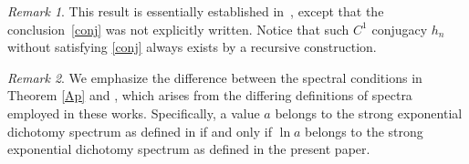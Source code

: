 \documentclass[reqno, a4paper, 10pt]{amsart}
\theoremstyle{plain}
\numberwithin{equation}{section}
\theoremstyle{remark}
\newtheorem{remark}{Remark}
\begin{document}
\begin{remark}
This result is essentially established in~\cite[Theorem 2]{DZZ}, except that the conclusion~\eqref{conj} was not explicitly written.  Notice that such $C^1$ conjugacy $h_n$ without satisfying \eqref{conj} always exists by a recursive construction.
\end{remark}

\begin{remark}\label{remark: diff def spect}
We emphasize the difference between the spectral conditions in Theorem \ref{Ap} and \cite[Theorem 2]{DZZ}, which arises from the differing definitions of spectra employed in these works. Specifically, a value $a$ belongs to the strong exponential dichotomy spectrum as defined in \cite{DZZ} if and only if $\ln a$ belongs to the strong exponential dichotomy spectrum as defined in the present paper.
\end{remark}

\end{document}
